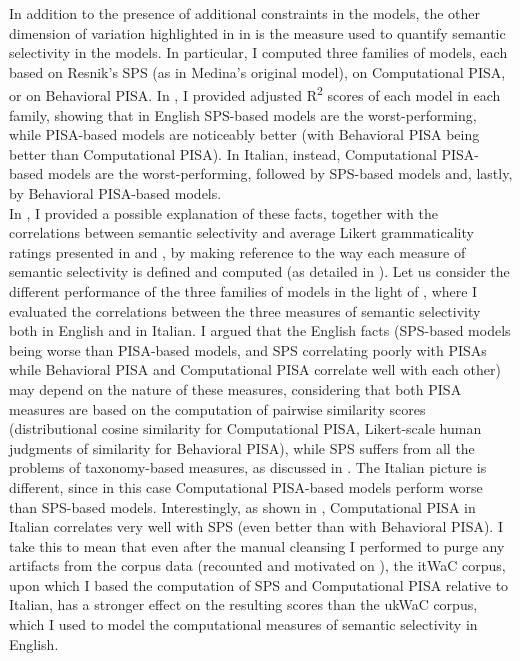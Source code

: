 In addition to the presence of additional constraints in the models, the other dimension of variation highlighted in  in  is the measure used to quantify semantic selectivity in the models. In particular, I computed three families of models, each based on Resnik's SPS (as in Medina's original model), on Computational PISA, or on Behavioral PISA. In , I provided adjusted R\textsuperscript{2} scores of each model in each family, showing that in English SPS-based models are the worst-performing, while PISA-based models are noticeably better (with Behavioral PISA being better than Computational PISA). In Italian, instead, Computational PISA-based models are the worst-performing, followed by SPS-based models and, lastly, by Behavioral PISA-based models.\\
In , I provided a possible explanation of these facts, together with the correlations between semantic selectivity and average Likert grammaticality ratings presented in  and , by making reference to the way each measure of semantic selectivity is defined and computed (as detailed in ). Let us consider the different performance of the three families of models in the light of , where I evaluated the correlations between the three measures of semantic selectivity both in English and in Italian. I argued that the English facts (SPS-based models being worse than PISA-based models, and SPS correlating poorly with PISAs while Behavioral PISA and Computational PISA correlate well with each other) may depend on the nature of these measures, considering that both PISA measures are based on the computation of pairwise similarity scores (distributional cosine similarity for Computational PISA, Likert-scale human judgments of similarity for Behavioral PISA), while SPS suffers from all the problems of taxonomy-based measures, as discussed in . The Italian picture is different, since in this case Computational PISA-based models perform worse than SPS-based models. Interestingly, as shown in , Computational PISA in Italian correlates very well with SPS (even better than with Behavioral PISA). I take this to mean that even after the manual cleansing I performed to purge any artifacts from the corpus data (recounted and motivated on ), the itWaC corpus, upon which I based the computation of SPS and Computational PISA relative to Italian, has a stronger effect on the resulting scores than the ukWaC corpus, which I used to model the computational measures of semantic selectivity in English.\\
